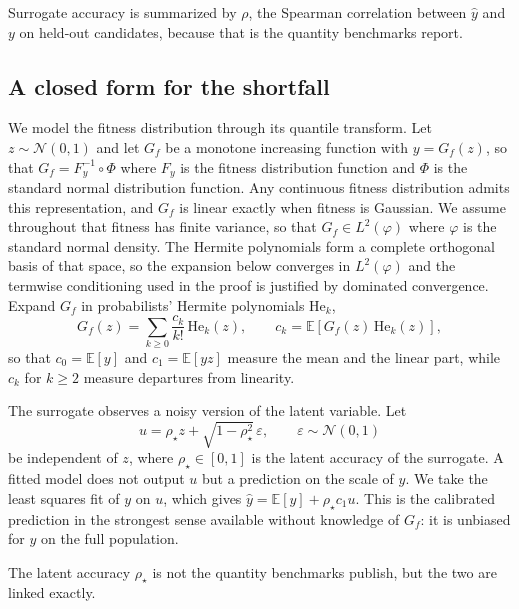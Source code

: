 \documentclass{article}
\theoremstyle{plain}
\theoremstyle{definition}
\newcommand{\yhat}{\hat{y}}
\newcommand{\Exp}{\mathbb{E}}
\newcommand{\He}{\mathrm{He}}
\newcommand{\Normal}{\mathcal{N}}
\begin{document}
Surrogate accuracy is summarized by $\rho$, the Spearman correlation between $\yhat$
and $y$ on held-out candidates, because that is the quantity benchmarks report.

\subsection{A closed form for the shortfall}
\label{sec:theory}

We model the fitness distribution through its quantile transform. Let $z \sim
\Normal(0,1)$ and let $G_{\!f}$ be a monotone increasing function with $y = G_{\!f}(z)$,
so that $G_{\!f} = F_y^{-1} \circ \Phi$ where $F_y$ is the fitness distribution function
and $\Phi$ is the standard normal distribution function. Any continuous fitness
distribution admits this representation, and $G_{\!f}$ is linear exactly when fitness is
Gaussian. We assume throughout that fitness has finite variance, so that $G_{\!f} \in
L^2(\varphi)$ where $\varphi$ is the standard normal density. The Hermite polynomials
form a complete orthogonal basis of that space, so the expansion below converges in
$L^2(\varphi)$ and the termwise conditioning used in the proof is justified by
dominated convergence. Expand $G_{\!f}$ in probabilists' Hermite polynomials $\He_k$,
\begin{equation}
G_{\!f}(z) = \sum_{k \ge 0} \frac{c_k}{k!}\, \He_k(z),
\qquad c_k = \Exp\!\left[G_{\!f}(z)\,\He_k(z)\right],
\label{eq:hermite}
\end{equation}
so that $c_0 = \Exp[y]$ and $c_1 = \Exp[y z]$ measure the mean and the linear part,
while $c_k$ for $k \ge 2$ measure departures from linearity.

The surrogate observes a noisy version of the latent variable. Let
\begin{equation}
u = \rho_\star z + \sqrt{1-\rho_\star^2}\,\varepsilon,
\qquad \varepsilon \sim \Normal(0,1)
\label{eq:signal}
\end{equation}
be independent of $z$, where $\rho_\star \in [0,1]$ is the latent accuracy of the
surrogate. A fitted model does not output $u$ but a prediction on the scale of $y$. We
take the least squares fit of $y$ on $u$, which gives $\yhat = \Exp[y] + \rho_\star c_1
u$. This is the calibrated prediction in the strongest sense available without
knowledge of $G_{\!f}$: it is unbiased for $y$ on the full population.

The latent accuracy $\rho_\star$ is not the quantity benchmarks publish, but the two are
linked exactly.
\end{document}
